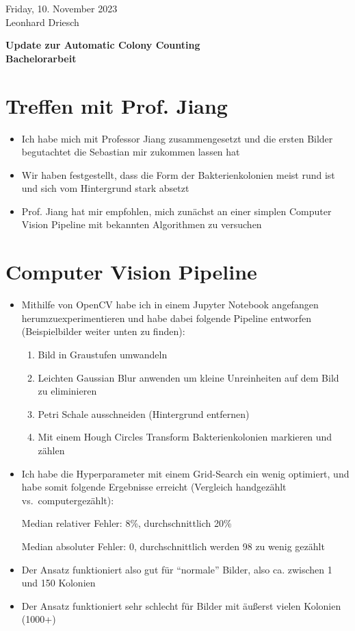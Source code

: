 \documentclass[12pt]{article}
\begin{document}
Friday, 10. November 2023\\
Leonhard Driesch

\vspace{8pt}
{\color{titlegray}\bfseries\fontsize{20}{25}\selectfont Update zur Automatic Colony Counting\\Bachelorarbeit\par}
\vspace{8pt}

\section{Treffen mit Prof. Jiang}
\begin{itemize}
  \item Ich habe mich mit Professor Jiang zusammengesetzt und die ersten Bilder begutachtet die Sebastian mir zukommen lassen hat
  \item Wir haben festgestellt, dass die Form der Bakterienkolonien meist rund ist und sich vom Hintergrund stark absetzt
  \item Prof. Jiang hat mir empfohlen, mich zunächst an einer simplen Computer Vision Pipeline mit bekannten Algorithmen zu versuchen
\end{itemize}

\section{Computer Vision Pipeline}
\begin{itemize}
  \item Mithilfe von OpenCV habe ich in einem Jupyter Notebook angefangen herumzuexperimentieren und habe dabei folgende Pipeline entworfen (Beispielbilder weiter unten zu finden):
  \begin{enumerate}
    \item Bild in Graustufen umwandeln
    \item Leichten Gaussian Blur anwenden um kleine Unreinheiten auf dem Bild zu eliminieren
    \item Petri Schale ausschneiden (Hintergrund entfernen)
    \item Mit einem Hough Circles Transform Bakterienkolonien markieren und zählen
  \end{enumerate}
  \item Ich habe die Hyperparameter mit einem Grid-Search ein wenig optimiert, und habe somit folgende Ergebnisse erreicht (Vergleich handgezählt vs.\ computergezählt):

  \vspace{6pt}
  \hspace*{22pt}Median relativer Fehler: 8\%, durchschnittlich 20\%

  \vspace{6pt}
  \hspace*{22pt}Median absoluter Fehler: 0, durchschnittlich werden 98 zu wenig gezählt
  \item Der Ansatz funktioniert also gut für “normale” Bilder, also ca. zwischen 1 und 150 Kolonien
  \item Der Ansatz funktioniert sehr schlecht für Bilder mit äußerst vielen Kolonien (1000+)
\end{itemize}
\end{document}
